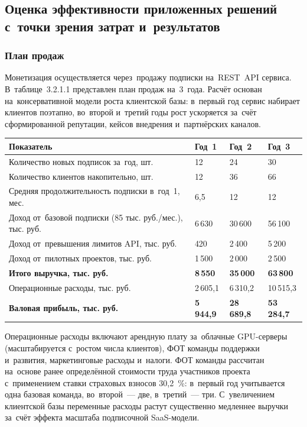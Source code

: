 \subsection{Оценка эффективности приложенных решений с~точки зрения затрат и~результатов}

\subsubsection{План продаж}

Монетизация осуществляется через~продажу подписки на~REST~API сервиса.
В~таблице~3.2.1.1 представлен план продаж на~3~года. Расчёт основан
на~консервативной модели роста клиентской базы: в~первый год сервис набирает
клиентов поэтапно, во~второй и~третий годы рост ускоряется за~счёт
сформированной репутации, кейсов внедрения и~партнёрских каналов.

{\small
\begin{longtable}{L{9.0cm} C{1.8cm} C{1.8cm} C{1.8cm}}
\toprule
Показатель & Год~1 & Год~2 & Год~3 \\
\midrule
\endhead
Количество новых подписок за~год, шт. & 12 & 24 & 30 \\
Количество клиентов накопительно, шт. & 12 & 36 & 66 \\
Средняя продолжительность подписки в~год~1, мес. & 6,5 & 12 & 12 \\
Доход от~базовой подписки (85 тыс. руб./мес.), тыс. руб. & 6\,630 & 30\,600 & 56\,100 \\
Доход от~превышения лимитов API, тыс. руб. & 420 & 2\,400 & 5\,200 \\
Доход от~пилотных проектов, тыс. руб. & 1\,500 & 2\,000 & 2\,500 \\
\midrule
\textbf{Итого выручка, тыс. руб.} & \textbf{8\,550} & \textbf{35\,000} & \textbf{63\,800} \\
Операционные расходы, тыс. руб. & 2\,605,1 & 6\,310,2 & 10\,515,3 \\
\textbf{Валовая прибыль, тыс. руб.} & \textbf{5\,944,9} & \textbf{28\,689,8} & \textbf{53\,284,7} \\
\bottomrule
\end{longtable}
}

Операционные расходы включают арендную плату за~облачные GPU-серверы
(масштабируется с~ростом числа клиентов), ФОТ команды поддержки и~развития,
маркетинговые расходы и~налоги. ФОТ команды рассчитан на~основе ранее
определённой стоимости труда участников проекта с~применением ставки страховых
взносов 30,2~\%: в~первый год учитывается одна базовая команда, во~второй~---
две, в~третий~--- три. С~увеличением клиентской базы переменные расходы растут
существенно медленнее выручки за~счёт эффекта масштаба подписочной SaaS-модели.

